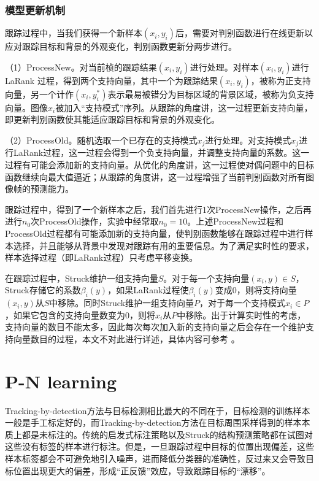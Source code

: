 \subsubsection{模型更新机制}
跟踪过程中，当我们获得一个新样本$(x_i,y_i)$后，需要对判别函数进行在线更新以应对跟踪目标和背景的外观变化，判别函数更新分两步进行。
\begin{namelist}{}
	\item
	（1）ProcessNew。对当前桢的跟踪结果$(x_i,y_i)$进行处理。对样本$(x_i,y_i)$进行LaRank \cite{larank} \cite{struck}过程，得到两个支持向量，其中一个为跟踪结果$(x_i, y_i)$，被称为正支持向量，另一个计作$(x_i,y_i^*)$表示最易被错分为目标区域的背景区域，被称为负支持向量。图像$x_i$被加入``支持模式''序列。从跟踪的角度讲，这一过程更新支持向量，即更新判别函数使其能适应跟踪目标和背景的外观变化。
	\item
	（2）ProcessOld。随机选取一个已存在的支持模式$x_j$进行处理。对支持模式$x_j$进行LaRank过程，这一过程会得到一个负支持向量，并调整支持向量的系数。这一过程有可能会添加新的支持向量。从优化的角度讲，这一过程使对偶问题中的目标函数继续向最大值逼近；从跟踪的角度讲，这一过程增强了当前判别函数对所有图像帧的预测能力。
\end{namelist}
跟踪过程中，得到了一个新样本之后，我们首先进行1次ProcessNew操作，之后再进行$n_0$次ProcessOld操作，实验中经常取$n_0=10$。上述ProcessNew过程和ProcessOld过程都有可能添加新的支持向量，使判别函数能够在跟踪过程中进行样本选择，并且能够从背景中发现对跟踪有用的重要信息。为了满足实时性的要求，样本选择过程（即LaRank过程）只考虑平移变换。

在跟踪过程中，Struck维护一组支持向量$S$。对于每一个支持向量$(x_i,y)\in S$，Struck存储它的系数$\beta_i(y)$，如果LaRank过程使$\beta_i(y)$变成0，则将支持向量$(x_i,y)$从$S$中移除。同时Struck维护一组支持向量$P$，对于每一个支持模式$x_i\in P$，如果它包含的支持向量数变为0，则将$x_i$从$P$中移除。出于计算实时性的考虑，支持向量的数目不能太多，因此每次每次加入新的支持向量之后会存在一个维护支持向量数目的过程，本文不对此进行详述，具体内容可参考 \cite{struck}。
\section{P-N learning}
Tracking-by-detection方法与目标检测相比最大的不同在于，目标检测的训练样本一般是手工标定好的，而Tracking-by-detection方法在目标周围采样得到的样本本质上都是未标注的。传统的启发式标注策略以及Struck的结构预测策略都在试图对这些没有标签的样本进行标注。但是，一旦跟踪过程中目标的位置出现偏差，这些样本标签都会不可避免地引入噪声，进而降低分类器的准确性，反过来又会导致目标位置出现更大的偏差，形成``正反馈''效应，导致跟踪目标的``漂移''。

